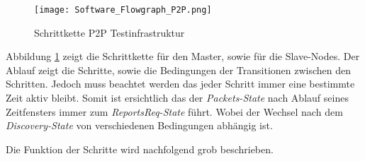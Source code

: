 \begin{figure} [H]
	\centering
	\texttt{[image: Software\_Flowgraph\_P2P.png]}
	\caption{Schrittkette P2P Testinfrastruktur}
	\label{fig:FlowgraphP2P}
\end{figure}

Abbildung \ref{fig:FlowgraphP2P} zeigt die Schrittkette für den Master, sowie für die Slave-Nodes. Der Ablauf zeigt die Schritte, sowie die Bedingungen der Transitionen zwischen den Schritten. Jedoch muss beachtet werden das jeder Schritt immer eine bestimmte Zeit aktiv bleibt. Somit ist ersichtlich das der \textit{Packets-State} nach Ablauf seines Zeitfensters immer zum \textit{ReportsReq-State} führt. Wobei der Wechsel nach dem \textit{Discovery-State} von verschiedenen Bedingungen abhängig ist.

Die Funktion der Schritte wird nachfolgend grob beschrieben. 

